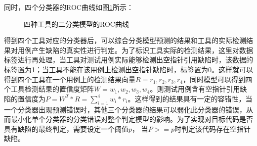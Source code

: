 同时，四个分类器的ROC曲线如图\ref{fig:6-4}所示：

\begin{figure}[ht]
	\label{fig:6-4}
	\centering
	\caption{四种工具的二分类模型的ROC曲线}
\end{figure}


得到四个工具对应的分类器后，可以综合分类模型预测的结果和工具的实际检测结果对用例产生缺陷的真实性进行判定。为了标识工具实际的检测结果，这里对数据标签进行再处理，当工具对测试用例实际能够检测出空指针引用缺陷时，该数据的标签置为1；当工具不能在该用例上检测出空指针缺陷时，标签置为0。这样就可以得到四个工具在一个用例上的检测结果向量$R={r_1, r_2, r_3, r_4}$，同时模型可以得到四个工具检测结果的置信度矩阵$W={w_1, w_2, w_3, w_4}$。则测试用例含有空指针引用缺陷的置信度为$P = W^T*R = \sum_{i=1}^4 w_i*r_i$。这样得到的结果具有一定的容错性，当一个分类器出现预测错误时，其他三个分类器的结果可以弱化此分类器的错误，从而最小化单个分类器的分类错误对整个判定模型的影响。为了实现对目标代码是否具有缺陷的最终判定，需要设定一个阈值$p$， 当$P>=p$时判定该代码存在空指针缺陷。

